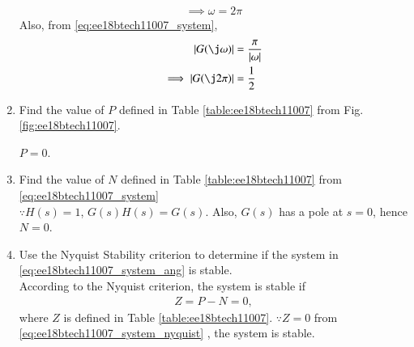 \begin{enumerate}[label=\thesection.\arabic*.,ref=\thesection.\theenumi]
\begin{align}
\\
\implies \omega = 2\pi
\end{align}
Also, from \eqref{eq:ee18btech11007_system},
\begin{align}
\label{eq:ee18btech11007_system_mod}
\abs{ G(\j\omega)}&=\frac{\pi }{\abs{\omega}}
\\
\implies \abs{ G(\j2\pi)} &= \frac{1}{2}
\end{align}
%
\item Find the value of $P$ defined in Table \ref{table:ee18btech11007} from Fig.  \ref{fig:ee18btech11007}.
\begin{table}[!ht]
\centering

\caption{}
\label{table:ee18btech11007}
\end{table}

%
\solution $P = 0$.
\item Find the value of $N$ defined in Table \ref{table:ee18btech11007} from  \eqref{eq:ee18btech11007_system}
\\
\solution $\because H(s) = 1$, $G(s)H(s) = G(s)$. Also, $G(s)$ has a pole at $s = 0$, hence $N = 0$.
\item Use the Nyquist Stability criterion to determine if the system in \eqref{eq:ee18btech11007_system_ang} is stable.
\\
\solution According to the Nyquist criterion, the system is stable if
\begin{align}
\label{eq:ee18btech11007_system_nyquist}
Z = P-N = 0,    
\end{align}
%
where $Z$ is defined in Table \ref{table:ee18btech11007}.   
$\because Z = 0$ from \eqref{eq:ee18btech11007_system_nyquist}
,  the system is stable.
%

\end{enumerate}
